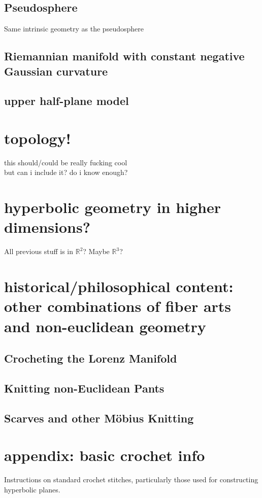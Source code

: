 \documentclass{article}
\begin{document}
\subsection{Pseudosphere}
Same intrinsic geometry as the pseudosphere
\subsection{Riemannian manifold with constant negative Gaussian curvature}
\subsection{upper half-plane model}

\section{topology!}
this should/could be really fucking cool\\
but can i include it? do i know enough?

\section{hyperbolic geometry in higher dimensions?}
All previous stuff is in $\mathbb{R}^2$? Maybe $\mathbb{R}^3$?

\section{historical/philosophical content: other combinations of fiber arts and non-euclidean geometry}
\subsection{Crocheting the Lorenz Manifold \cite{crochetlorenz}}
\subsection{Knitting non-Euclidean Pants \cite{makingmath}}
\subsection{Scarves and other M\"obius Knitting \cite{magicalknitting}\cite{magicalknitting2}}

\section{appendix: basic crochet info}
Instructions on standard crochet stitches, particularly those used for constructing hyperbolic planes. \cite{happyhooker}

\newpage


\end{document}
